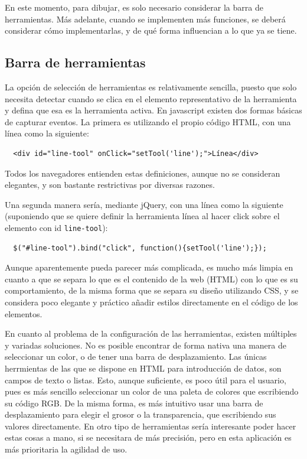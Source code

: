 En este momento, para dibujar, es solo necesario considerar la barra de herramientas. Más adelante, cuando se implementen más funciones, se deberá considerar cómo implementarlas, y de qué forma influencian a lo que ya se tiene.

\subsection{Barra de herramientas} %
\label{sub:barra_de_herramientas}

La opción de selección de herramientas es relativamente sencilla, puesto que solo necesita detectar cuando se clica en el elemento representativo de la herramienta y defina que esa es la herramienta activa. En javascript existen dos formas básicas de capturar eventos. La primera es utilizando el propio código HTML, con una línea como la siguiente:
\begin{verbatim}
  <div id="line-tool" onClick="setTool('line');">Línea</div>
\end{verbatim}
Todos los navegadores entienden estas definiciones, aunque no se consideran elegantes, y son bastante restrictivas por diversas razones.

Una segunda manera sería, mediante jQuery, con una línea como la siguiente (suponiendo que se quiere definir la herramienta línea al hacer click sobre el elemento con id \texttt{line-tool}):
\begin{verbatim}
  $("#line-tool").bind("click", function(){setTool('line');});
\end{verbatim}
Aunque aparentemente pueda parecer más complicada, es mucho más limpia en cuanto a que se separa lo que es el contenido de la web (HTML) con lo que es su comportamiento, de la misma forma que se separa su diseño utilizando CSS, y se considera poco elegante y práctico añadir estilos directamente en el código de los elementos.

En cuanto al problema de la configuración de las herramientas, existen múltiples y variadas soluciones. No es posible encontrar de forma nativa una manera de seleccionar un color, o de tener una barra de desplazamiento. Las únicas herrmientas de las que se dispone en HTML para introducción de datos, son campos de texto o listas. Esto, aunque suficiente, es poco útil para el usuario, pues es más sencillo seleccionar un color de una paleta de colores que escribiendo su código RGB. De la misma forma, es más intuitivo usar una barra de desplazamiento para elegir el grosor o la transparencia, que escribiendo sus valores directamente. En otro tipo de herramientas sería interesante poder hacer estas cosas a mano, si se necesitara de más precisión, pero en esta aplicación es más prioritaria la agilidad de uso.

